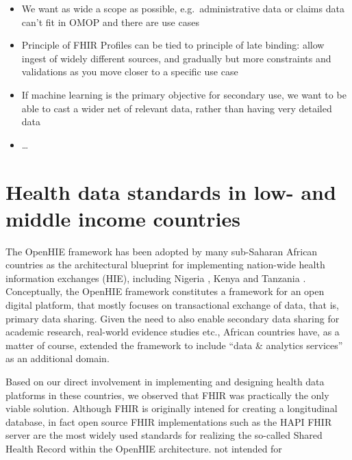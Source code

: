 \documentclass[
  authoryear]{elsarticle}
\providecommand{\tightlist}{%
  \setlength{\itemsep}{0pt}\setlength{\parskip}{0pt}}\usepackage{longtable,booktabs,array}
\begin{document}
\begin{itemize}
  \begin{itemize}
  \tightlist
  \item
    We want as wide a scope as possible, e.g.~administrative data or
    claims data can't fit in OMOP and there are use cases
  \item
    Principle of FHIR Profiles can be tied to principle of late binding:
    allow ingest of widely different sources, and gradually but more
    constraints and validations as you move closer to a specific use
    case
  \item
    If machine learning is the primary objective for secondary use, we
    want to be able to cast a wider net of relevant data, rather than
    having very detailed data
  \item
    \ldots{}
  \end{itemize}
\end{itemize}

\section{Health data standards in low- and middle income
countries}\label{health-data-standards-in-low--and-middle-income-countries}

The OpenHIE framework \citep{openhie} has been adopted by many
sub-Saharan African countries \citep{mamuye2022health} as the
architectural blueprint for implementing nation-wide health information
exchanges (HIE), including Nigeria \citep{dalhatu2023paper}, Kenya
\citep{thaiya2021adoption} and Tanzania \citep{nsaghurwe2021one}.
Conceptually, the OpenHIE framework constitutes a framework for an open
digital platform, that mostly focuses on transactional exchange of data,
that is, primary data sharing. Given the need to also enable secondary
data sharing for academic research, real-world evidence studies etc.,
African countries have, as a matter of course, extended the framework to
include ``data \& analytics services'' as an additional domain.

Based on our direct involvement in implementing and designing health
data platforms in these countries, we observed that FHIR was practically
the only viable solution. Although FHIR is originally intened for
creating a longitudinal database, in fact open source FHIR
implementations such as the HAPI FHIR server are the most widely used
standards for realizing the so-called Shared Health Record within the
OpenHIE architecture. not intended for
\end{document}
